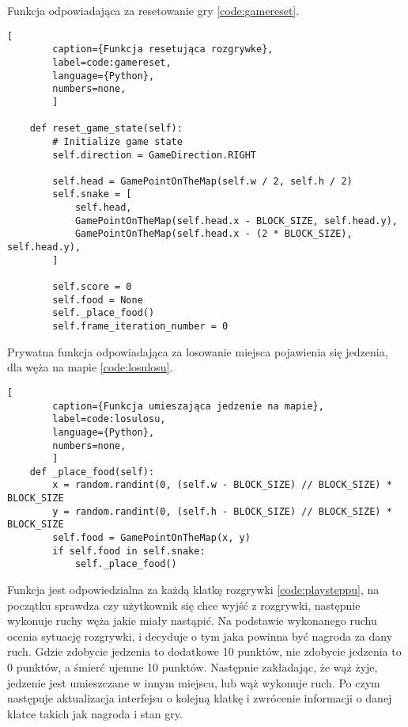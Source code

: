 \clearpage

Funkcja odpowiadająca za resetowanie gry \ref{code:gamereset}.

\begin{onepage}
    \begin{lstlisting}[
        caption={Funkcja resetująca rozgrywke},
        label=code:gamereset,
        language={Python},
        numbers=none,
        ]

    def reset_game_state(self):
        # Initialize game state
        self.direction = GameDirection.RIGHT

        self.head = GamePointOnTheMap(self.w / 2, self.h / 2)
        self.snake = [
            self.head,
            GamePointOnTheMap(self.head.x - BLOCK_SIZE, self.head.y),
            GamePointOnTheMap(self.head.x - (2 * BLOCK_SIZE), self.head.y),
        ]

        self.score = 0
        self.food = None
        self._place_food()
        self.frame_iteration_number = 0

    \end{lstlisting}
\end{onepage}


Prywatna funkcja odpowiadająca za losowanie miejsca pojawienia się jedzenia, dla węża na mapie \ref{code:losulosu}.

\begin{onepage}
    \begin{lstlisting}[
        caption={Funkcja umieszająca jedzenie na mapie},
        label=code:losulosu,
        language={Python},
        numbers=none,
        ]
    def _place_food(self):
        x = random.randint(0, (self.w - BLOCK_SIZE) // BLOCK_SIZE) * BLOCK_SIZE
        y = random.randint(0, (self.h - BLOCK_SIZE) // BLOCK_SIZE) * BLOCK_SIZE
        self.food = GamePointOnTheMap(x, y)
        if self.food in self.snake:
            self._place_food()
    \end{lstlisting}
\end{onepage}

\clearpage

Funkcja  jest odpowiedzialna za każdą klatkę rozgrywki \ref{code:playsteppu}, na początku sprawdza czy użytkownik się chce wyjść z rozgrywki, następnie wykonuje ruchy węża jakie miały nastąpić. Na podstawie wykonanego ruchu ocenia sytuację rozgrywki, i decyduje o tym jaka powinna być nagroda za dany ruch. Gdzie zdobycie jedzenia to dodatkowe 10 punktów, nie zdobycie jedzenia to 0 punktów, a śmierć ujemne 10 punktów. Następnie zakładając, że wąż żyje, jedzenie jest umieszczane w innym miejscu, lub wąż wykonuje ruch. Po czym następuje aktualizacja interfejsu o kolejną klatkę i zwrócenie informacji o danej klatce takich jak nagroda i stan gry.

